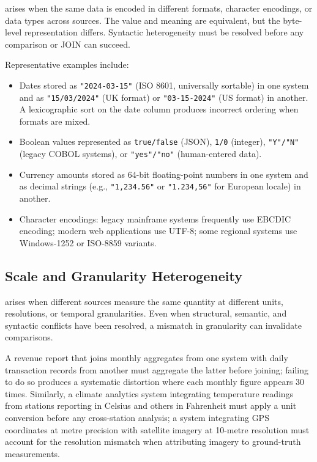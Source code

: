  arises when the same data is encoded in
different formats, character encodings, or data types across sources.
The value and meaning are equivalent, but the byte-level representation
differs. Syntactic heterogeneity must be resolved before any comparison
or JOIN can succeed.

Representative examples include:
\begin{itemize}
  \item Dates stored as \texttt{"2024-03-15"} (ISO 8601, universally
        sortable) in one system and as \texttt{"15/03/2024"} (UK format)
        or \texttt{"03-15-2024"} (US format) in another. A lexicographic
        sort on the date column produces incorrect ordering when formats
        are mixed.
  \item Boolean values represented as \texttt{true/false} (JSON),
        \texttt{1/0} (integer), \texttt{"Y"/"N"} (legacy COBOL systems),
        or \texttt{"yes"/"no"} (human-entered data).
  \item Currency amounts stored as 64-bit floating-point numbers in one
        system and as decimal strings (e.g., \texttt{"1,234.56"} or
        \texttt{"1.234,56"} for European locale) in another.
  \item Character encodings: legacy mainframe systems frequently use
        EBCDIC encoding; modern web applications use UTF-8; some regional
        systems use Windows-1252 or ISO-8859 variants.
\end{itemize}

\subsection{Scale and Granularity Heterogeneity}
\label{subsec:scale-hetero}

 arises when different sources
measure the same quantity at different units, resolutions, or temporal
granularities. Even when structural, semantic, and syntactic conflicts
have been resolved, a mismatch in granularity can invalidate
comparisons.

A revenue report that joins monthly aggregates from one system with
daily transaction records from another must aggregate the latter before
joining; failing to do so produces a systematic distortion where
each monthly figure appears 30 times. Similarly, a climate analytics
system integrating temperature readings from stations reporting in
Celsius and others in Fahrenheit must apply a unit conversion before
any cross-station analysis; a system integrating GPS coordinates at
metre precision with satellite imagery at 10-metre resolution must
account for the resolution mismatch when attributing imagery to
ground-truth measurements.

